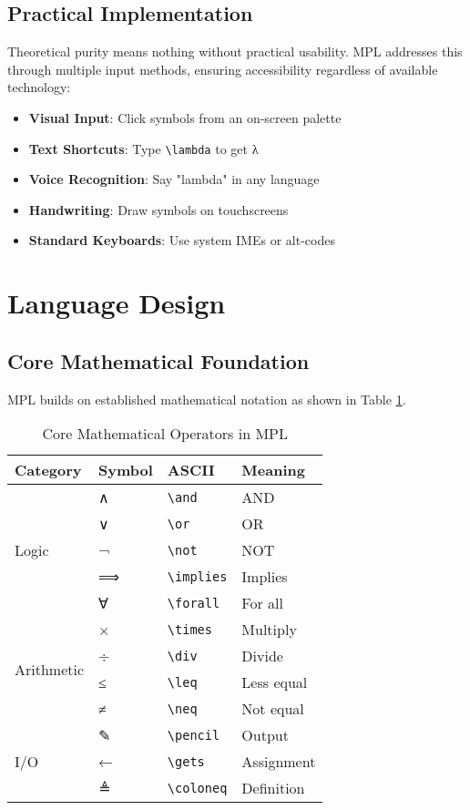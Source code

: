 \documentclass[10pt,conference]{IEEEtran}
\begin{document}
\subsection{Practical Implementation}

Theoretical purity means nothing without practical usability. MPL addresses this through multiple input methods, ensuring accessibility regardless of available technology:

\begin{itemize}
\item \textbf{Visual Input}: Click symbols from an on-screen palette
\item \textbf{Text Shortcuts}: Type \texttt{\textbackslash lambda} to get λ
\item \textbf{Voice Recognition}: Say "lambda" in any language
\item \textbf{Handwriting}: Draw symbols on touchscreens
\item \textbf{Standard Keyboards}: Use system IMEs or alt-codes
\end{itemize}

\section{Language Design}

\subsection{Core Mathematical Foundation}

MPL builds on established mathematical notation as shown in Table \ref{tab:operators}.

\begin{table}[htbp]
\caption{Core Mathematical Operators in MPL}
\label{tab:operators}
\centering
\begin{tabular}{|l|l|l|l|}
\hline
\textbf{Category} & \textbf{Symbol} & \textbf{ASCII} & \textbf{Meaning} \\
\hline
\multirow{5}{*}{Logic} & ∧ & \texttt{\textbackslash and} & AND \\
& ∨ & \texttt{\textbackslash or} & OR \\
& ¬ & \texttt{\textbackslash not} & NOT \\
& ⟹ & \texttt{\textbackslash implies} & Implies \\
& ∀ & \texttt{\textbackslash forall} & For all \\
\hline
\multirow{4}{*}{Arithmetic} & × & \texttt{\textbackslash times} & Multiply \\
& ÷ & \texttt{\textbackslash div} & Divide \\
& ≤ & \texttt{\textbackslash leq} & Less equal \\
& ≠ & \texttt{\textbackslash neq} & Not equal \\
\hline
\multirow{3}{*}{I/O} & ✎ & \texttt{\textbackslash pencil} & Output \\
& ← & \texttt{\textbackslash gets} & Assignment \\
& ≜ & \texttt{\textbackslash coloneq} & Definition \\
\hline
\end{tabular}
\end{table}
\end{document}
